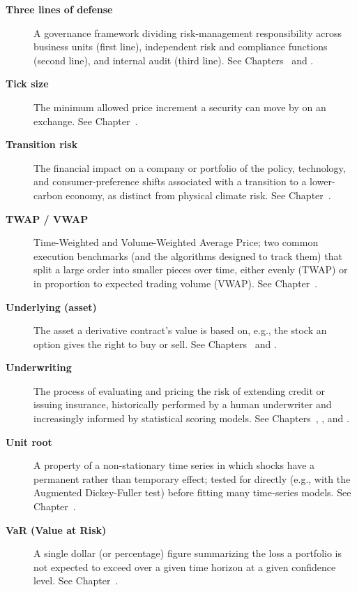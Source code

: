 \documentclass[../ai_in_finance]{subfiles}
\begin{document}
\begin{description}
\item[\textbf{Three lines of defense}] A governance framework dividing risk-management responsibility across business units (first line), independent risk and compliance functions (second line), and internal audit (third line). See Chapters~ and .

\item[\textbf{Tick size}] The minimum allowed price increment a security can move by on an exchange. See Chapter~.

\item[\textbf{Transition risk}] The financial impact on a company or portfolio of the policy, technology, and consumer-preference shifts associated with a transition to a lower-carbon economy, as distinct from physical climate risk. See Chapter~.

\item[\textbf{TWAP / VWAP}] Time-Weighted and Volume-Weighted Average Price; two common execution benchmarks (and the algorithms designed to track them) that split a large order into smaller pieces over time, either evenly (TWAP) or in proportion to expected trading volume (VWAP). See Chapter~.

\item[\textbf{Underlying (asset)}] The asset a derivative contract's value is based on, e.g., the stock an option gives the right to buy or sell. See Chapters~ and .

\item[\textbf{Underwriting}] The process of evaluating and pricing the risk of extending credit or issuing insurance, historically performed by a human underwriter and increasingly informed by statistical scoring models. See Chapters~, , and .

\item[\textbf{Unit root}] A property of a non-stationary time series in which shocks have a permanent rather than temporary effect; tested for directly (e.g., with the Augmented Dickey-Fuller test) before fitting many time-series models. See Chapter~.

\item[\textbf{VaR (Value at Risk)}] A single dollar (or percentage) figure summarizing the loss a portfolio is not expected to exceed over a given time horizon at a given confidence level. See Chapter~.


\end{description}
\end{document}
